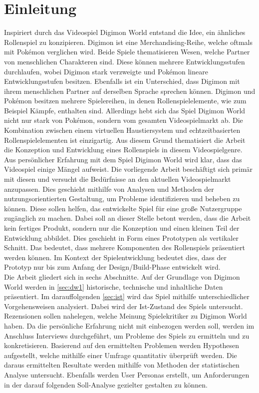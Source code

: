 \section{Einleitung}
Inspiriert durch das Videospiel Digimon World entstand die Idee, ein ähnliches Rollenspiel zu konzipieren. Digimon ist eine Merchandising-Reihe, welche oftmals mit Pokémon verglichen wird\cite{ign}\cite{digimon-reflections}. Beide Spiele thematisieren Wesen, welche Partner von menschlichen Charakteren sind. Diese können mehrere Entwicklungsstufen durchlaufen, wobei Digimon stark verzweigte und Pokémon lineare Entwicklungsstufen besitzen. Ebenfalls ist ein Unterschied, dass Digimon mit ihrem menschlichen Partner auf derselben Sprache sprechen können. Digimon und Pokémon besitzen mehrere Spielereihen, in denen Rollenspielelemente, wie zum Beispiel Kämpfe, enthalten sind. Allerdings hebt sich das Spiel Digimon World nicht nur stark von Pokémon, sondern vom gesamten Videospielmarkt ab. Die Kombination zwischen einem virtuellen Haustiersystem und echtzeitbasierten Rollenspielelementen ist einzigartig. Aus diesem Grund thematisiert die Arbeit die Konzeption und Entwicklung eines Rollenspiels in diesem Videospielgenre. \\

Aus persönlicher Erfahrung mit dem Spiel Digimon World wird klar, dass das Videospiel einige Mängel aufweist. Die vorliegende Arbeit beschäftigt sich primär mit diesen und versucht die Bedürfnisse an den aktuellen Videospielmarkt anzupassen. Dies geschieht mithilfe von Analysen und Methoden der nutzungsorientierten Gestaltung, um Probleme identifizieren und beheben zu können. Diese sollen helfen, das entwickelte Spiel für eine große Nutzergruppe zugänglich zu machen. Dabei soll an dieser Stelle betont werden, dass die Arbeit kein fertiges Produkt, sondern nur die Konzeption und einen kleinen Teil der Entwicklung abbildet. Dies geschieht in Form eines Prototypen als vertikaler Schnitt. Das bedeutet, dass mehrere Komponenten des Rollenspiels präsentiert werden können. Im Kontext der Spielentwicklung bedeutet dies, dass der Prototyp nur bis zum Anfang der Design/Build-Phase entwickelt wird\cite{game-user-research}.  \\

Die Arbeit gliedert sich in sechs Abschnitte. Auf der Grundlage von Digimon World werden in \autoref{sec:dw1} historische, technische und inhaltliche Daten präsentiert. Im darauffolgenden \autoref{sec:ist} wird das Spiel mithilfe unterschiedlicher Vorgehensweisen analysiert. Dabei wird der Ist-Zustand des Spiels untersucht. Rezensionen sollen nahelegen, welche Meinung Spielekritiker zu Digimon World haben. Da die persönliche Erfahrung nicht mit einbezogen werden soll, werden im Anschluss Interviews durchgeführt, um Probleme des Spiels zu ermitteln und zu konkretisieren. Basierend auf den ermittelten Problemen werden Hypothesen aufgestellt, welche mithilfe einer Umfrage quantitativ überprüft werden. Die daraus ermittelten Resultate werden mithilfe von Methoden der statistischen Analyse untersucht. Ebenfalls werden User Personas erstellt, um Anforderungen in der darauf folgenden Soll-Analyse gezielter gestalten zu können.
\newpage


